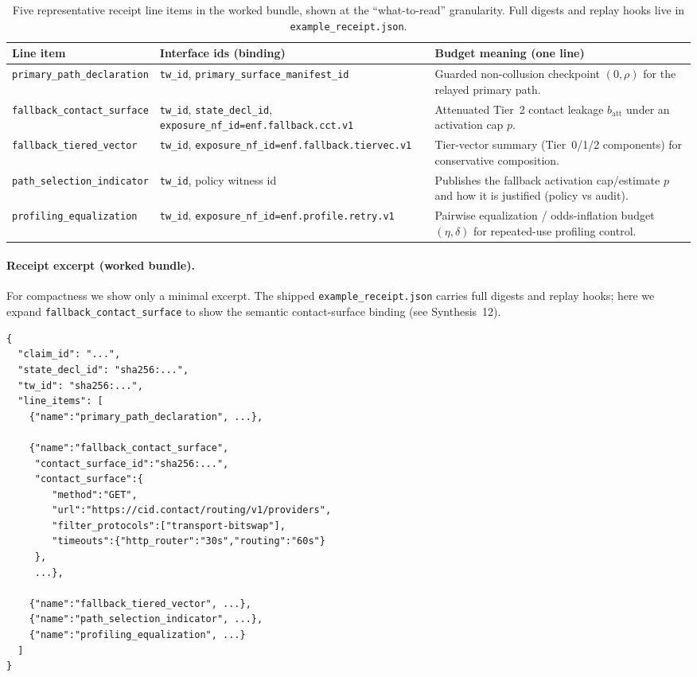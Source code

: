 \documentclass[11pt]{article}
\begin{document}
\begin{table}[ht]
\centering
\footnotesize
\setlength{\tabcolsep}{4pt}
\renewcommand{\arraystretch}{1.05}
\begin{tabularx}{\linewidth}{@{}l >{\raggedright\arraybackslash}X >{\raggedright\arraybackslash}X@{}}
\toprule
Line item & Interface ids (binding) & Budget meaning (one line) \\
\midrule
\texttt{primary\_path\_declaration} & \texttt{tw\_id}, \texttt{primary\_surface\_manifest\_id} & Guarded non-collusion checkpoint $(0,\rho)$ for the relayed primary path. \\
\texttt{fallback\_contact\_surface} & \texttt{tw\_id}, \texttt{state\_decl\_id}, \texttt{exposure\_nf\_id=enf.\allowbreak fallback.\allowbreak cct.\allowbreak v1} & Attenuated Tier~2 contact leakage $b_{\mathrm{att}}$ under an activation cap $p$. \\
\texttt{fallback\_tiered\_vector} & \texttt{tw\_id}, \texttt{exposure\_nf\_id=enf.\allowbreak fallback.\allowbreak tiervec.\allowbreak v1} & Tier-vector summary (Tier~0/1/2 components) for conservative composition. \\
\texttt{path\_selection\_indicator} & \texttt{tw\_id}, policy witness id & Publishes the fallback activation cap/estimate $p$ and how it is justified (policy vs audit). \\
\texttt{profiling\_equalization} & \texttt{tw\_id}, \texttt{exposure\_nf\_id=enf.\allowbreak profile.\allowbreak retry.\allowbreak v1} & Pairwise equalization / odds-inflation budget $(\eta,\delta)$ for repeated-use profiling control. \\
\bottomrule
\end{tabularx}
\caption{Five representative receipt line items in the worked bundle, shown at the ``what-to-read'' granularity. Full digests and replay hooks live in \texttt{example\_receipt.json}.}
\label{tab:lineitemglance}
\end{table}

\paragraph{Receipt excerpt (worked bundle).}
For compactness we show only a minimal excerpt. The shipped \texttt{example\_receipt.json} carries full digests and replay hooks; here we expand \texttt{fallback\_contact\_surface} to show the semantic contact-surface binding (see Synthesis~12).\cite{series:receiptitems}
\begin{verbatim}
{
  "claim_id": "...",
  "state_decl_id": "sha256:...",
  "tw_id": "sha256:...",
  "line_items": [
    {"name":"primary_path_declaration", ...},

    {"name":"fallback_contact_surface",
     "contact_surface_id":"sha256:...",
     "contact_surface":{
        "method":"GET",
        "url":"https://cid.contact/routing/v1/providers",
        "filter_protocols":["transport-bitswap"],
        "timeouts":{"http_router":"30s","routing":"60s"}
     },
     ...},

    {"name":"fallback_tiered_vector", ...},
    {"name":"path_selection_indicator", ...},
    {"name":"profiling_equalization", ...}
  ]
}
\end{verbatim}
\end{document}
